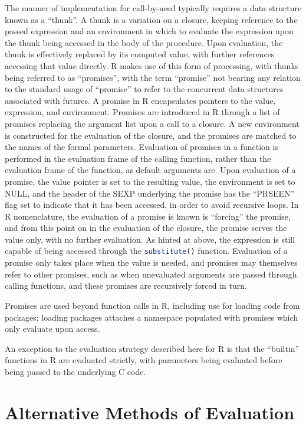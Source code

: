 \documentclass[10pt,a4paper]{article}
\begin{document}
The manner of implementation for call-by-need typically requires a data structure known as a ``thunk''.
A thunk is a variation on a closure, keeping reference to the passed expression and an environment in which to evaluate the expression upon the thunk being accessed in the body of the procedure.
Upon evaluation, the thunk is effectively replaced by its computed value, with further references accessing that value directly.
R makes use of this form of processing, with thunks being referred to as ``promises'', with the term ``promise'' not bearing any relation to the standard usage of ``promise'' to refer to the concurrent data structures associated with futures.
A promise in R encapsulates pointers to the value, expression, and environment.
Promises are introduced in R through a list of promises replacing the argument list upon a call to a closure.
A new environment is constructed for the evaluation of the closure, and the promises are matched to the names of the formal parameters.
Evaluation of promises in a function is performed in the evaluation frame of the calling function, rather than the evaluation frame of the function, as default arguments are.
Upon evaluation of a promise, the value pointer is set to the resulting value, the environment is set to NULL, and the header of the SEXP underlying the promise has the ``PRSEEN'' flag set to indicate that it has been accessed, in order to avoid recursive loops.
In R nomenclature, the evaluation of a promise is known is ``forcing'' the promise, and from this point on in the evaluation of the closure, the promise serves the value only, with no further evaluation.
As hinted at above, the expression is still capable of being accessed through the \lstinline[language=R]{substitute()} function.
Evaluation of a promise only takes place when the value is needed, and promises may themselves refer to other promises, such as when unevaluated arguments are passed through calling functions, and these promises are recursively forced in turn.

Promises are used beyond function calls in R, including use for loading code from packages; loading packages attaches a namespace populated with promises which only evaluate upon access.

An exception to the evaluation strategy described here for R is that the ``builtin'' functions in R are evaluated strictly, with parameters being evaluated before being passed to the underlying C code.

\section{Alternative Methods of Evaluation}
\end{document}
